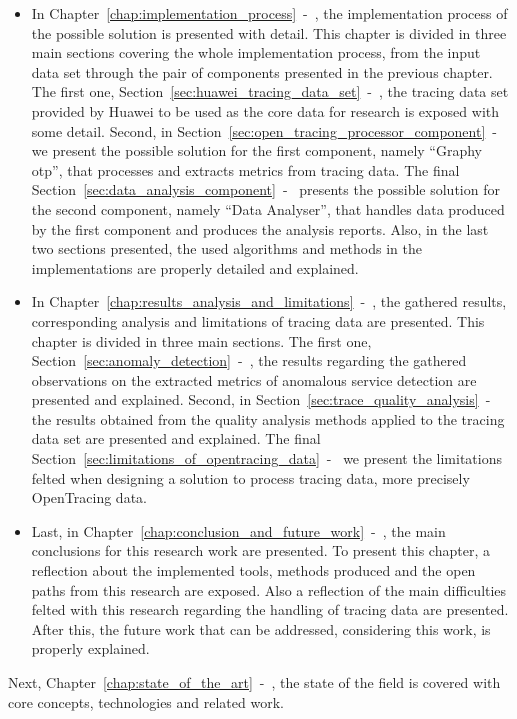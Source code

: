 \begin{itemize}
    \item In Chapter~\ref{chap:implementation_process}~-~, the implementation process of the possible solution is presented with detail. This chapter is divided in three main sections covering the whole implementation process, from the input data set through the pair of components presented in the previous chapter. The first one, Section~\ref{sec:huawei_tracing_data_set}~-~, the tracing data set provided by Huawei to be used as the core data for research is exposed with some detail. Second, in Section~\ref{sec:open_tracing_processor_component}~-~ we present the possible solution for the first component, namely ``Graphy \gls{otp}'', that processes and extracts metrics from tracing data. The final Section~\ref{sec:data_analysis_component}~-~ presents the possible solution for the second component, namely ``Data Analyser'', that handles data produced by the first component and produces the analysis reports. Also, in the last two sections presented, the used algorithms and methods in the implementations are properly detailed and explained.
    \item In Chapter~\ref{chap:results_analysis_and_limitations}~-~, the gathered results, corresponding analysis and limitations of tracing data are presented. This chapter is divided in three main sections. The first one, Section~\ref{sec:anomaly_detection}~-~, the results regarding the gathered observations on the extracted metrics of anomalous service detection are presented and explained. Second, in Section~\ref{sec:trace_quality_analysis}~-~ the results obtained from the quality analysis methods applied to the tracing data set are presented and explained. The final Section~\ref{sec:limitations_of_opentracing_data}~-~ we present the limitations felted when designing a solution to process tracing data, more precisely OpenTracing data.
    \item Last, in Chapter~\ref{chap:conclusion_and_future_work}~-~, the main conclusions for this research work are presented. To present this chapter, a reflection about the implemented tools, methods produced and the open paths from this research are exposed. Also a reflection of the main difficulties felted with this research regarding the handling of tracing data are presented. After this, the future work that can be addressed, considering this work, is properly explained.
\end{itemize}


Next, Chapter~\ref{chap:state_of_the_art}~-~, the state of the field is covered with core concepts, technologies and related work.

\checkoddpage
{}
{
    \newpage
    \blankpage
}
{
}